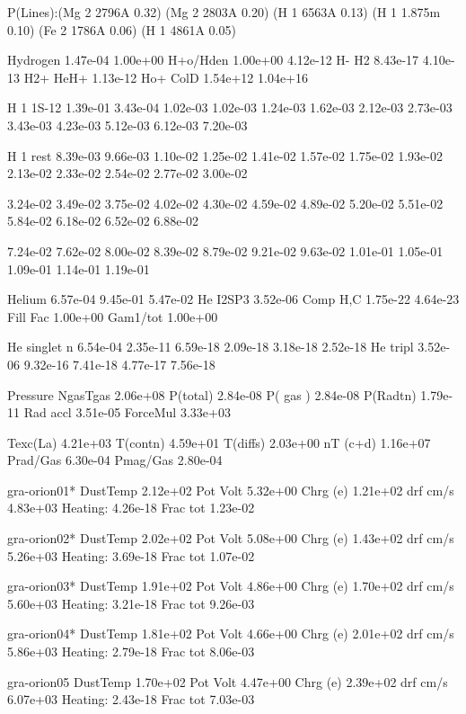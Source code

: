 {P(Lines):(Mg 2  2796A 0.32) (Mg 2  2803A 0.20) (H  1  6563A 0.13) (H  1
1.875m 0.10) (Fe 2  1786A 0.06) (H  1  4861A 0.05) 


Hydrogen      1.47e-04 1.00e+00 H+o/Hden 1.00e+00 4.12e-12 H-    H2 8.43e-17
4.10e-13 H2+ HeH+ 1.13e-12 Ho+ ColD 1.54e+12 1.04e+16



 H  1 1S-12    1.39e-01 3.43e-04 1.02e-03 1.02e-03 1.24e-03 1.62e-03 2.12e-03
2.73e-03 3.43e-03 4.23e-03 5.12e-03 6.12e-03 7.20e-03

 H  1  rest    8.39e-03 9.66e-03 1.10e-02 1.25e-02 1.41e-02 1.57e-02 1.75e-02
1.93e-02 2.13e-02 2.33e-02 2.54e-02 2.77e-02 3.00e-02

               3.24e-02 3.49e-02 3.75e-02 4.02e-02 4.30e-02 4.59e-02 4.89e-02
5.20e-02 5.51e-02 5.84e-02 6.18e-02 6.52e-02 6.88e-02

               7.24e-02 7.62e-02 8.00e-02 8.39e-02 8.79e-02 9.21e-02 9.63e-02
1.01e-01 1.05e-01 1.09e-01 1.14e-01 1.19e-01 



Helium        6.57e-04 9.45e-01 5.47e-02 He I2SP3 3.52e-06 Comp H,C 1.75e-22
4.64e-23 Fill Fac 1.00e+00 Gam1/tot 1.00e+00



He singlet n  6.54e-04 2.35e-11 6.59e-18 2.09e-18 3.18e-18 2.52e-18 He tripl
3.52e-06 9.32e-16 7.41e-18 4.77e-17 7.56e-18



Pressure      NgasTgas 2.06e+08 P(total) 2.84e-08 P( gas ) 2.84e-08 P(Radtn)
1.79e-11 Rad accl 3.51e-05 ForceMul 3.33e+03

              Texc(La) 4.21e+03 T(contn) 4.59e+01 T(diffs) 2.03e+00 nT (c+d)
1.16e+07 Prad/Gas 6.30e-04 Pmag/Gas 2.80e-04


 gra-orion01*  DustTemp 2.12e+02 Pot Volt 5.32e+00 Chrg (e) 1.21e+02 drf
cm/s 4.83e+03 Heating: 4.26e-18 Frac tot 1.23e-02

 gra-orion02*  DustTemp 2.02e+02 Pot Volt 5.08e+00 Chrg (e) 1.43e+02 drf
cm/s 5.26e+03 Heating: 3.69e-18 Frac tot 1.07e-02

 gra-orion03*  DustTemp 1.91e+02 Pot Volt 4.86e+00 Chrg (e) 1.70e+02 drf
cm/s 5.60e+03 Heating: 3.21e-18 Frac tot 9.26e-03

 gra-orion04*  DustTemp 1.81e+02 Pot Volt 4.66e+00 Chrg (e) 2.01e+02 drf
cm/s 5.86e+03 Heating: 2.79e-18 Frac tot 8.06e-03

 gra-orion05   DustTemp 1.70e+02 Pot Volt 4.47e+00 Chrg (e) 2.39e+02 drf
cm/s 6.07e+03 Heating: 2.43e-18 Frac tot 7.03e-03

}
